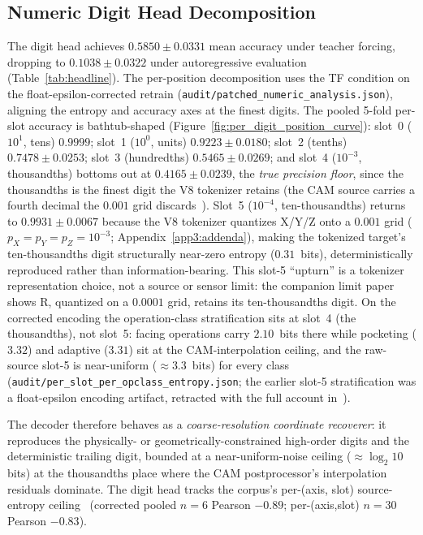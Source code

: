 \documentclass[sensors,article,submit,moreauthors,pdftex]{Definitions/mdpi}
\begin{document}
\subsection{Numeric Digit Head Decomposition}
\label{sec:numeric-decomposition}

The digit head achieves $0.5850 \pm 0.0331$ mean accuracy under teacher forcing, dropping to $0.1038 \pm 0.0322$ under autoregressive evaluation (Table~\ref{tab:headline}). The per-position decomposition uses the TF condition on the float-epsilon-corrected retrain (\texttt{audit/patched\_numeric\_analysis.json}), aligning the entropy and accuracy axes at the finest digits. The pooled 5-fold per-slot accuracy is bathtub-shaped (Figure~\ref{fig:per_digit_position_curve}): slot~0 ($10^{1}$, tens) $0.9999$; slot~1 ($10^{0}$, units) $0.9223 \pm 0.0180$; slot~2 (tenths) $0.7478 \pm 0.0253$; slot~3 (hundredths) $0.5465 \pm 0.0269$; and slot~4 ($10^{-3}$, thousandths) bottoms out at $0.4165 \pm 0.0239$, the \emph{true precision floor}, since the thousandths is the finest digit the V8 tokenizer retains (the CAM source carries a fourth decimal the $0.001$ grid discards~\cite{paperB_entropy}). Slot~5 ($10^{-4}$, ten-thousandths) returns to $0.9931 \pm 0.0067$ because the V8 tokenizer quantizes X/Y/Z onto a $0.001$ grid ($p_X\!=\!p_Y\!=\!p_Z\!=\!10^{-3}$; Appendix~\ref{app3:addenda}), making the tokenized target's ten-thousandths digit structurally near-zero entropy ($0.31$~bits), deterministically reproduced rather than information-bearing. This slot-5 ``upturn'' is a tokenizer representation choice, not a source or sensor limit: the companion limit paper~\cite{paperB_entropy} shows R, quantized on a $0.0001$ grid, retains its ten-thousandths digit. On the corrected encoding the operation-class stratification sits at slot~4 (the thousandths), not slot~5: facing operations carry $2.10$~bits there while pocketing ($3.32$) and adaptive ($3.31$) sit at the CAM-interpolation ceiling, and the raw-source slot-5 is near-uniform ($\approx\!3.3$~bits) for every class (\texttt{audit/per\_slot\_per\_opclass\_entropy.json}; the earlier slot-5 stratification was a float-epsilon encoding artifact, retracted with the full account in~\cite{paperB_entropy}).

The decoder therefore behaves as a \emph{coarse-resolution coordinate recoverer}: it reproduces the physically- or geometrically-constrained high-order digits and the deterministic trailing digit, bounded at a near-uniform-noise ceiling ($\approx\!\log_2 10$ bits) at the thousandths place where the CAM postprocessor's interpolation residuals dominate. The digit head tracks the corpus's per-(axis, slot) source-entropy ceiling~\cite{paperB_entropy} (corrected pooled $n\!=\!6$ Pearson $-0.89$; per-(axis,slot) $n\!=\!30$ Pearson $-0.83$).
\end{document}
